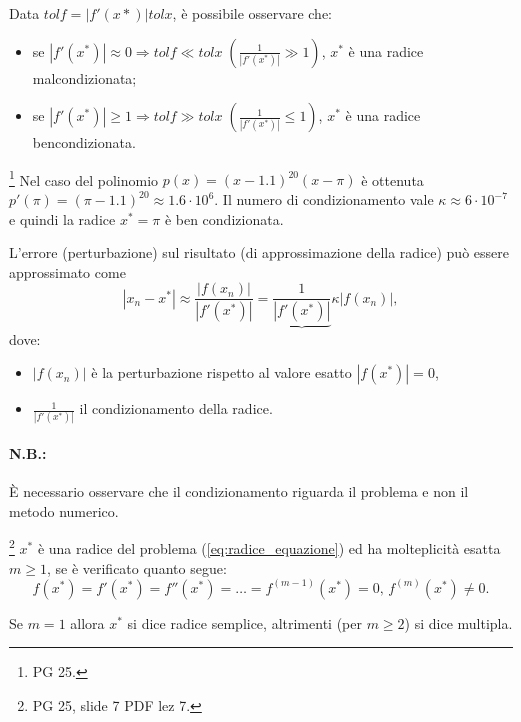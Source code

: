 \begin{remark}
	Data $tolf = |f'(x*)|tolx$, è possibile osservare che:
	\begin{itemize}
		\item se $|f'(x^*)|\approx 0\Rightarrow tolf\ll tolx\; \left(\frac{1}{|f'(x^*)|}\gg 1\right)$, $x^*$ è una radice malcondizionata;
		
		\item se $|f'(x^*)|\geq 1 \Rightarrow tolf\gg tolx\; \left(\frac{1}{|f'(x^*)|}\leq 1\right)$, $x^*$ è una radice bencondizionata.
	\end{itemize}
\end{remark}

\begin{example}\footnote{PG 25.}
	Nel caso del polinomio $p(x)=(x-1.1)^{20}(x-\pi)$ è ottenuta $p'(\pi)=(\pi-1.1)^{20}\approx 1.6\cdot 10^6$. Il numero di condizionamento vale $\kappa\approx 6\cdot 10^{-7}$ e quindi la radice $x^*=\pi$ è ben condizionata.
\end{example}

\begin{definition}
	L'errore (perturbazione) sul risultato (di approssimazione della radice) può essere approssimato come
	\begin{equation*}
		|x_n-x^*|\approx\frac{|f(x_n)|}{|f'(x^*)|}=\underbrace{\frac{1}{|f'(x^*)|}}{\kappa}|f(x_n)|,
	\end{equation*}
	dove:
	\begin{itemize}
		\item $|f(x_n)|$ è la perturbazione rispetto al valore esatto $|f(x^*)|=0$,
		\item  $\frac{1}{|f'(x^*)|}$ il condizionamento della radice.
	\end{itemize}
\end{definition}

\paragraph{N.B.:} È necessario osservare che il condizionamento riguarda il problema e non il \gls{metodo numerico}.

\begin{definition}\label{def:radice_molteplicita_m}
	\footnote{PG 25, slide 7 PDF lez 7.} $x^*$ è una radice del problema (\ref{eq:radice_equazione}) ed ha molteplicità esatta $m\geq 1$, se è verificato quanto segue:
	\begin{equation*}
		f(x^*)=f'(x^*)=f''(x^*)=\hdots=f^{(m-1)}(x^*)=0,\, f^{(m)}(x^*)\neq 0.
	\end{equation*}
\end{definition}
Se $m=1$ allora $x^*$ si dice radice semplice, altrimenti (per $m\geq 2$) si dice multipla.

